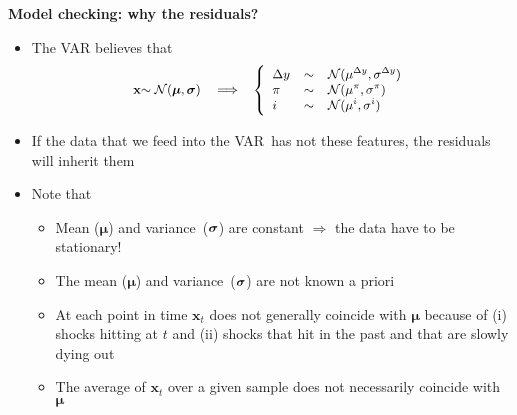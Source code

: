 \documentclass[10pt,handout]{beamer}
\begin{document}
\begin{frame}
{\textbf{Model checking: why the residuals?}}

\begin{itemize}
\item The VAR believes that%
\begin{equation*}
\mathbf{x}{\small \sim \mathcal{N}(\mathbf{\mu },\mathbf{\sigma })\ \ \
\Longrightarrow \ \ \ }\left\{ {\small 
\begin{array}{lll}
\Delta y & \sim & \mathcal{N}(\mu ^{\Delta y},\sigma ^{\Delta y}) \\ 
\pi & \sim & \mathcal{N}(\mu ^{\pi },\sigma ^{\pi }) \\ 
i & \sim & \mathcal{N}(\mu ^{i},\sigma ^{i})%
\end{array}%
}\right.
\end{equation*}

\item If the data that we feed into the VAR\ has not these features, the
residuals will inherit them\pause

\item Note that

\begin{itemize}
\item Mean ($\mathbf{\mu }$) and variance\ (${\small \mathbf{\sigma }}$) are
constant $\Longrightarrow $ the data have to be stationary!\smallskip 
\pause

\item The mean ($\mathbf{\mu }$) and variance\ (${\small \mathbf{\sigma }}$)
are not known a priori \smallskip \pause

\item At each point in time $\mathbf{x}_{t}$ does not generally coincide
with $\mathbf{\mu }$ because of (i) shocks hitting at $t$ and (ii) shocks
that hit in the past and that are slowly dying out \smallskip \pause

\item The average of $\mathbf{x}_{t}$ over a given sample does not
necessarily coincide with $\mathbf{\mu }$
\end{itemize}
\end{itemize}
\end{frame}

\vspace{.1cm}
\end{document}
